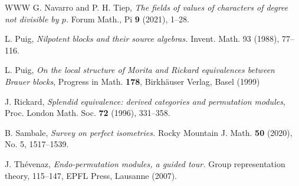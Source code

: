 \documentclass{amsart} %
\theoremstyle{plain}\newtheorem{Theorem}{Theorem}[section]
\theoremstyle{plain}\newtheorem{Conjecture}[Theorem]{Conjecture}
\theoremstyle{plain}\newtheorem{Corollary}[Theorem]{Corollary}
\theoremstyle{plain}\newtheorem{Lemma}[Theorem]{Lemma}
\theoremstyle{plain}\newtheorem{Proposition}[Theorem]{Proposition}
\theoremstyle{definition}\newtheorem{Definition}[Theorem]{Definition}
\theoremstyle{definition}\newtheorem{Example}[Theorem]{Example}
\theoremstyle{definition}\newtheorem{Examples}[Theorem]{Examples}
\theoremstyle{definition}\newtheorem{Remark}[Theorem]{Remark}
\theoremstyle{definition}\newtheorem{Remarks}[Theorem]{Remarks}
\theoremstyle{plain}\newtheorem{Statement}[Theorem]{}
\begin{document}
\begin{thebibliography}{WWW}
 G. Navarro and P. H. Tiep, {\em The fields of values of characters
of degree not divisible by $p$.} Forum Math., Pi {\bf 9} (2021), 1--28.

 L. Puig, {\em Nilpotent blocks and their source algebras.} 
Invent. Math. 93 (1988), 77--116.


 L. Puig, {\em On the local structure of Morita 
and Rickard equivalences between Brauer blocks}, Progress in
Math. {\bf 178}, Birkh\"auser Verlag, Basel (1999) 

 J. Rickard, {\em Splendid equivalence: 
derived categories and permutation modules}, Proc. London Math. 
Soc. {\bf 72} (1996), 331--358.

 B. Sambale, {\em Survey on perfect isometries.} Rocky Mountain
J. Math. {\bf 50} (2020), No. 5, 1517--1539.


 J. Th\'evenaz, {\em Endo-permutation modules, 
a guided tour.} Group representation theory, 115–147, EPFL Press, 
Lausanne (2007).


\end{thebibliography}
\end{document}
